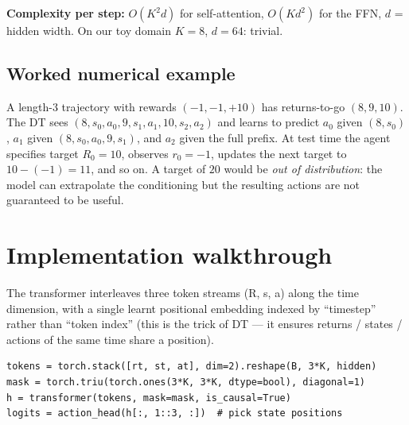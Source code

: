 \documentclass[11pt,oneside]{scrbook}
\begin{document}
\begin{algorithm}[H]
\caption{Decision Transformer (training)}
\end{algorithm}

\textbf{Complexity per step:} $O(K^2 d)$ for self-attention, $O(Kd^2)$ for the FFN, $d$ = hidden width. On our toy domain $K=8$, $d=64$: trivial.

\section{Worked numerical example}

A length-3 trajectory with rewards $(-1, -1, +10)$ has returns-to-go $(8, 9, 10)$. The DT sees $(8, s_0, a_0, 9, s_1, a_1, 10, s_2, a_2)$ and learns to predict $a_0$ given $(8, s_0)$, $a_1$ given $(8, s_0, a_0, 9, s_1)$, and $a_2$ given the full prefix. At test time the agent specifies target $R_0 = 10$, observes $r_0=-1$, updates the next target to $10-(-1)=11$, and so on. A target of $20$ would be \emph{out of distribution}: the model can extrapolate the conditioning but the resulting actions are not guaranteed to be useful.

\chapter{Implementation walkthrough}

The transformer interleaves three token streams (R, s, a) along the time dimension, with a single learnt positional embedding indexed by ``timestep'' rather than ``token index'' (this is the trick of DT --- it ensures returns / states / actions of the same time share a position).

\begin{codebox}
\begin{verbatim}
tokens = torch.stack([rt, st, at], dim=2).reshape(B, 3*K, hidden)
mask = torch.triu(torch.ones(3*K, 3*K, dtype=bool), diagonal=1)
h = transformer(tokens, mask=mask, is_causal=True)
logits = action_head(h[:, 1::3, :])  # pick state positions
\end{verbatim}
\end{codebox}
\end{document}
